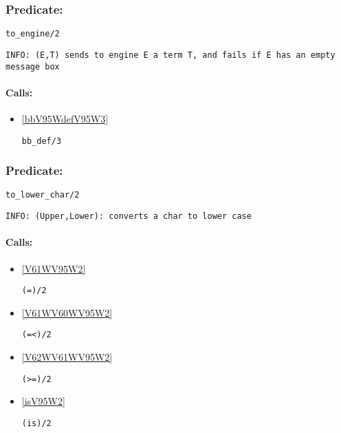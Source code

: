 \subsubsection{Predicate:} \label{toV95WengineV95W2}

\begin{verbatim}
to_engine/2
\end{verbatim}

{\small \begin{verbatim}
INFO: (E,T) sends to engine E a term T, and fails if E has an empty message box

\end{verbatim}}
\paragraph{Calls:} 
\begin{itemize}
\item \ref{bbV95WdefV95W3} 
\begin{verbatim}
bb_def/3
\end{verbatim}

\end{itemize}

\subsubsection{Predicate:} \label{toV95WlowerV95WcharV95W2}

\begin{verbatim}
to_lower_char/2
\end{verbatim}

{\small \begin{verbatim}
INFO: (Upper,Lower): converts a char to lower case

\end{verbatim}}
\paragraph{Calls:} 
\begin{itemize}
\item \ref{V61WV95W2} 
\begin{verbatim}
(=)/2
\end{verbatim}

\item \ref{V61WV60WV95W2} 
\begin{verbatim}
(=<)/2
\end{verbatim}

\item \ref{V62WV61WV95W2} 
\begin{verbatim}
(>=)/2
\end{verbatim}

\item \ref{isV95W2} 
\begin{verbatim}
(is)/2
\end{verbatim}

\end{itemize}
